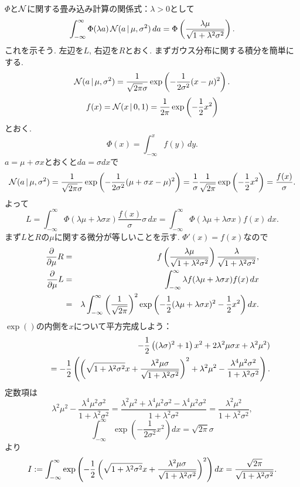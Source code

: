 $\Phi$と${\cal N}$に関する畳み込み計算の関係式：$\lambda>0$として
\begin{equation}\label{inv_probit}
\int_{-\infty}^\infty \Phi(\lambda a)\,{\cal N}(a\,|\,\mu,\sigma^2)\,da=\Phi\left(\frac{\lambda \mu}{\sqrt{1+\lambda^2\sigma^2}}\right).
\end{equation}
これを示そう. 左辺を$L$, 右辺を$R$とおく.
まずガウス分布に関する積分を簡単にする.
$$
{\cal N}(a\,|\,\mu,\sigma^2)=\frac{1}{\sqrt{2\pi}\sigma}\exp\left(-\frac{1}{2\sigma^2}(x-\mu)^2\right).
$$
$$
f(x)={\cal N}(x\,|\,0,1)=\frac{1}{2\pi}\exp\left(-\frac{1}{2} x^2\right)
$$
とおく.
$$
\Phi(x)=\int_{-\infty}^x f(y)\,dy.
$$
$a=\mu+\sigma x$とおくと$da=\sigma dx$で
$$
{\cal N}(a\,|\,\mu,\sigma^2)=\frac{1}{\sqrt{2\pi}\sigma}\exp\left(-\frac{1}{2\sigma^2}(\mu+\sigma x-\mu)^2\right)=\frac{1}{\sigma}\frac{1}{\sqrt{2\pi}}\exp\left(-\frac{1}{2} x^2\right)=\frac{f(x)}{\sigma}.
$$
よって
$$
L=\int_{-\infty}^\infty \Phi(\lambda \mu+\lambda\sigma x)\frac{f(x)}{\sigma}\sigma\,dx=\int_{-\infty}^\infty\Phi(\lambda \mu + \lambda \sigma x)f(x)\,dx.
$$
まず$L$と$R$の$\mu$に関する微分が等しいことを示す. $\Phi'(x)=f(x)$なので
\begin{eqnarray*}
\frac{\partial}{\partial \mu}R&=&f\left(\frac{\lambda \mu}{\sqrt{1+\lambda^2\sigma^2}}\right) \frac{\lambda}{\sqrt{1+\lambda^2\sigma^2}},
\\
\frac{\partial}{\partial \mu}L&=&\int_{-\infty}^\infty \lambda f(\lambda \mu + \lambda \sigma x)f(x)\,dx
\\
&=& \lambda \int_{-\infty}^\infty \left(\frac{1}{\sqrt{2\pi}}\right)^2\exp\left(-\frac{1}{2}(\lambda\mu+\lambda \sigma x)^2-\frac{1}{2} x^2\right) dx.
\end{eqnarray*}
$\exp()$の内側を$x$について平方完成しよう：
\begin{eqnarray*}
&&-\frac{1}{2}\left((\lambda\sigma)^2+1\right)x^2+2\lambda^2\mu \sigma x + \lambda^2 \mu^2)\\
&&\quad=-\frac{1}{2}\left(\left(\sqrt{1+\lambda^2\sigma^2}x+\frac{\lambda^2\mu \sigma}{\sqrt{1+\lambda^2\sigma^2}}\right)^2+\lambda^2 \mu^2-\frac{\lambda^4 \mu^2 \sigma^2}{1+\lambda^2 \sigma^2} \right).
\end{eqnarray*}
定数項は
$$
\lambda^2\mu^2-\frac{\lambda^4 \mu^2 \sigma^2}{1+\lambda^2 \sigma^2}=\frac{\lambda^2\mu^2+\lambda^4\mu^2\sigma^2-\lambda^4\mu^2\sigma^2}{1+\lambda^2 \sigma^2}=\frac{\lambda^2\mu^2}{1+\lambda^2 \sigma^2},
$$
$$
\int_{-\infty}^\infty\exp\left(-\frac{1}{2\sigma^2}x^2\right) dx=\sqrt{2\pi}\sigma
$$
より
$$
I:=\int_{-\infty}^\infty \exp\left(-\frac{1}{2}\left(\sqrt{1+\lambda^2\sigma^2}x+\frac{\lambda^2\mu\sigma}{\sqrt{1+\lambda^2\sigma^2}}\right)^2\right) dx=\frac{\sqrt{2\pi}}{\sqrt{1+\lambda^2\sigma^2}}.
$$
